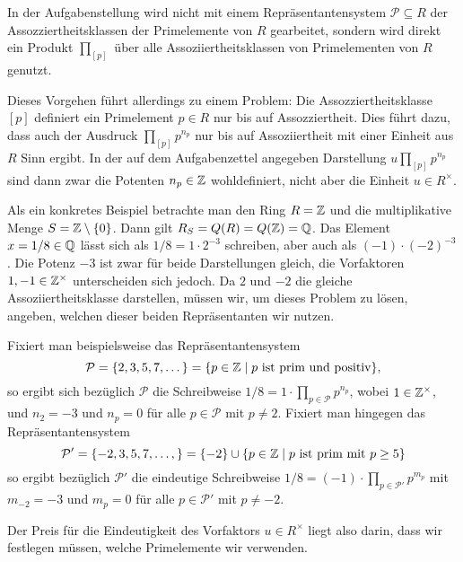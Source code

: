\documentclass[a4paper,10pt,numbers=noenddot]{scrartcl}
\begin{document}
\begin{remark}
  In der Aufgabenstellung wird nicht mit einem Repräsentantensystem $\mathcal{P} \subseteq R$ der Assozziertheitsklassen der Primelemente von $R$ gearbeitet, sondern wird direkt ein Produkt $\prod_{[p]}$ über alle Assoziiertheitsklassen von Primelementen von $R$ genutzt.
  
  Dieses Vorgehen führt allerdings zu einem Problem:
  Die Assozziertheitsklasse $[p]$ definiert ein Primelement $p \in R$ nur bis auf Assozziertheit.
  Dies führt dazu, dass auch der Ausdruck $\prod_{[p]} p^{n_p}$ nur bis auf Assoziiertheit mit einer Einheit aus $R$ Sinn ergibt.
  In der auf dem Aufgabenzettel angegeben Darstellung $u \prod_{[p]} p^{n_p}$ sind dann zwar die Potenten $n_p \in \mathbb{Z}$ wohldefiniert, nicht aber die Einheit $u \in R^\times$.
  
  Als ein konkretes Beispiel betrachte man den Ring $R = \mathbb{Z}$ und die multiplikative Menge $S = \mathbb{Z} \setminus \{0\}$.
  Dann gilt $R_S = Q(R) = Q(\mathbb{Z}) = \mathbb{Q}$.
  Das Element $x = 1/8 \in \mathbb{Q}$ lässt sich als $1/8 = 1 \cdot 2^{-3}$ schreiben, aber auch als $(-1) \cdot (-2)^{-3}$.
  Die Potenz $-3$ ist zwar für beide Darstellungen gleich, die Vorfaktoren $1, -1 \in \mathbb{Z}^\times$ unterscheiden sich jedoch.
  Da $2$ und $-2$ die gleiche Assoziiertheitsklasse darstellen, müssen wir, um dieses Problem zu lösen, angeben, welchen dieser beiden Repräsentanten wir nutzen.
  
  Fixiert man beispielsweise das Repräsentantensystem
  \[
      \mathcal{P}
    = \{ 2, 3, 5, 7, \dotsc \}
    = \{p \in \mathbb{Z} \mid \text{$p$ ist prim und positiv}\},
  \]
  so ergibt sich bezüglich $\mathcal{P}$ die Schreibweise $1/8 = 1 \cdot \prod_{p \in \mathcal{P}} p^{n_p}$, wobei $1 \in \mathbb{Z}^\times$, und $n_2 = -3$ und $n_p = 0$ für alle $p \in \mathcal{P}$ mit $p \neq 2$.
  Fixiert man hingegen das Repräsentantensystem
  \[
      \mathcal{P}'
    = \{ -2, 3, 5, 7, \dotsc, \}
    = \{ -2 \} \cup \{p \in \mathbb{Z} \mid \text{$p$ ist prim mit $p \geq 5$}\}
  \]
  so ergibt bezüglich $\mathcal{P}'$ die eindeutige Schreibweise $1/8 = (-1) \cdot \prod_{p \in \mathcal{P}'} p^{m_p}$ mit $m_{-2} = -3$ und $m_p = 0$ für alle $p \in \mathcal{P}'$ mit $p \neq -2$.
  
  Der Preis für die Eindeutigkeit des Vorfaktors $u \in R^\times$ liegt also darin, dass wir festlegen müssen, welche Primelemente wir verwenden.
\end{remark}
\end{document}
